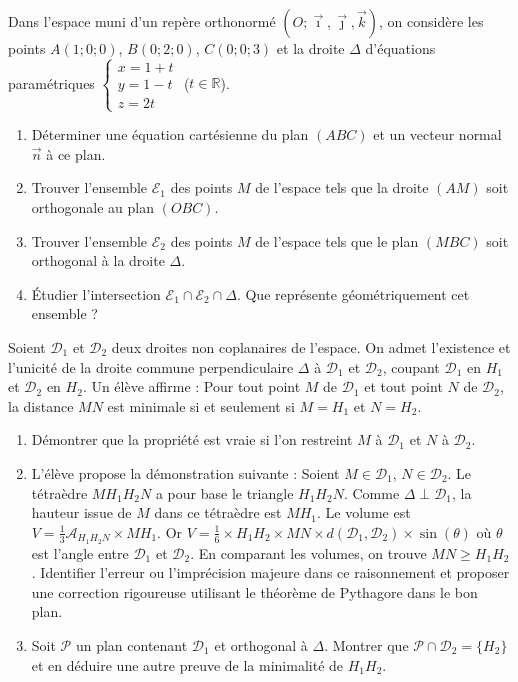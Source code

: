 \documentclass[11pt]{article}
\begin{document}
\begin{exercice}
Dans l'espace muni d'un repère orthonormé $(O; \vec{\imath}, \vec{\jmath}, \vec{k})$, on considère les points $A(1;0;0)$, $B(0;2;0)$, $C(0;0;3)$ et la droite $\Delta$ d'équations paramétriques $\begin{cases} x = 1 + t \\ y = 1 - t \\ z = 2t \end{cases}$ ($t \in \mathbb{R}$).
\begin{enumerate}
    \item Déterminer une équation cartésienne du plan $(ABC)$ et un vecteur normal $\vec{n}$ à ce plan.
    \item Trouver l'ensemble $\mathcal{E}_1$ des points $M$ de l'espace tels que la droite $(AM)$ soit orthogonale au plan $(OBC)$.
    \item Trouver l'ensemble $\mathcal{E}_2$ des points $M$ de l'espace tels que le plan $(MBC)$ soit orthogonal à la droite $\Delta$.
    \item Étudier l'intersection $\mathcal{E}_1 \cap \mathcal{E}_2 \cap \Delta$. Que représente géométriquement cet ensemble ?
\end{enumerate}
\end{exercice}

\begin{exercice}
Soient $\mathcal{D}_1$ et $\mathcal{D}_2$ deux droites non coplanaires de l'espace. On admet l'existence et l'unicité de la droite commune perpendiculaire $\Delta$ à $\mathcal{D}_1$ et $\mathcal{D}_2$, coupant $\mathcal{D}_1$ en $H_1$ et $\mathcal{D}_2$ en $H_2$.
Un élève affirme : \og Pour tout point $M$ de $\mathcal{D}_1$ et tout point $N$ de $\mathcal{D}_2$, la distance $MN$ est minimale si et seulement si $M = H_1$ et $N = H_2$. \fg
\begin{enumerate}
    \item Démontrer que la propriété est vraie si l'on restreint $M$ à $\mathcal{D}_1$ et $N$ à $\mathcal{D}_2$.
    \item L'élève propose la démonstration suivante : \og Soient $M \in \mathcal{D}_1$, $N \in \mathcal{D}_2$. Le tétraèdre $MH_1H_2N$ a pour base le triangle $H_1H_2N$. Comme $\Delta \perp \mathcal{D}_1$, la hauteur issue de $M$ dans ce tétraèdre est $MH_1$. Le volume est $V = \frac{1}{3} \mathcal{A}_{H_1H_2N} \times MH_1$. Or $V = \frac{1}{6} \times H_1H_2 \times MN \times d(\mathcal{D}_1, \mathcal{D}_2) \times \sin(\theta)$ où $\theta$ est l'angle entre $\mathcal{D}_1$ et $\mathcal{D}_2$. En comparant les volumes, on trouve $MN \geq H_1H_2$. \fg
    Identifier l'erreur ou l'imprécision majeure dans ce raisonnement et proposer une correction rigoureuse utilisant le théorème de Pythagore dans le bon plan.
    \item Soit $\mathcal{P}$ un plan contenant $\mathcal{D}_1$ et orthogonal à $\Delta$. Montrer que $\mathcal{P} \cap \mathcal{D}_2 = \{H_2\}$ et en déduire une autre preuve de la minimalité de $H_1H_2$.
\end{enumerate}
\end{exercice}
\end{document}
